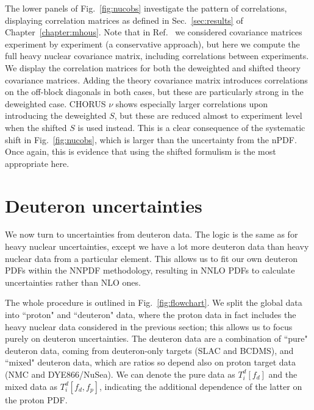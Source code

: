 The lower panels of Fig.~\ref{fig:nucobs} investigate the pattern of correlations, displaying correlation matrices as defined in Sec.~\ref{sec:results} of Chapter~\ref{chapter:mhous}. Note that in Ref.~\cite{Ball:2018twp} we considered covariance matrices experiment by experiment (a conservative approach), but here we compute the full heavy nuclear covariance matrix, including correlations between experiments. We display the correlation matrices for both the deweighted and shifted theory covariance matrices. Adding the theory covariance matrix introduces correlations on the off-block diagonals in both cases, but these are particularly strong in the deweighted case. CHORUS $\nu$ shows especially larger correlations upon introducing the deweighted $S$, but these are reduced almost to experiment level when the shifted $S$ is used instead. This is a clear consequence of the systematic shift in Fig.~\ref{fig:nucobs}, which is larger than the uncertainty from the nPDF. Once again, this is evidence that using the shifted formulism is the most appropriate here.

\section{Deuteron uncertainties}
\label{sec:deutunc}
We now turn to uncertainties from deuteron data. The logic is the same as for heavy nuclear uncertainties, except we have a lot more deuteron data than heavy nuclear data from a particular element. This allows us to fit our own deuteron PDFs within the NNPDF methodology, resulting in NNLO PDFs to calculate uncertainties rather than NLO ones. 

The whole procedure is outlined in Fig.~\ref{fig:flowchart}. We split the global data into ``proton" and ``deuteron" data, where the proton data in fact includes the heavy nuclear data considered in the previous section; this allows us to focus purely on deuteron uncertainties. The deuteron data are a combination of ``pure" deuteron data, coming from deuteron-only targets (SLAC and BCDMS), and ``mixed" deuteron data, which are ratios so depend also on proton target data (NMC and DYE866/NuSea). We can denote the pure data as $T_i^d[f_d]$ and the mixed data as $T_i^d[f_d, f_p]$, indicating the additional dependence of the latter on the proton PDF.

